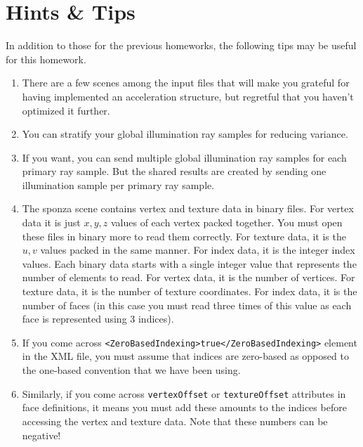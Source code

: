 \documentclass[12pt]{article}
\begin{document}
\section{Hints \& Tips}
In addition to those for the previous homeworks, the following tips may
be useful for this homework.

\begin{enumerate}

\item There are a few scenes among the input files that
will make you grateful for having implemented an acceleration
structure, but regretful that you haven't optimized it further.

\item You can stratify your global illumination ray samples for reducing
variance.

\item If you want, you can send multiple global illumination ray samples
for each primary ray sample. But the shared results are created by sending one
illumination sample per primary ray sample.

\item The sponza scene contains vertex and texture data in binary files.
For vertex data it is just $x, y, z$ values of each vertex packed
together. You must open these files in binary more to read them
correctly. For texture data, it is the $u, v$ values packed in the same
manner. For index data, it is the integer index values. Each binary data
starts with a single integer value that represents the number of
elements to read. For vertex data, it is the number of vertices. For
texture data, it is the number of texture coordinates. For index data,
it is the number of faces (in this case you must read three times of
this value as each face is represented using $3$ indices).

\item If you come across
\texttt{<ZeroBasedIndexing>true</ZeroBasedIndexing>} element in the XML
file, you must assume that indices are zero-based as opposed to the
one-based convention that we have been using.

\item Similarly, if you come across \texttt{vertexOffset} or
\texttt{textureOffset} attributes in face definitions, it means you
must add these amounts to the indices before accessing the vertex and
texture data. Note that these numbers can be negative!

\end{enumerate}
\end{document}
